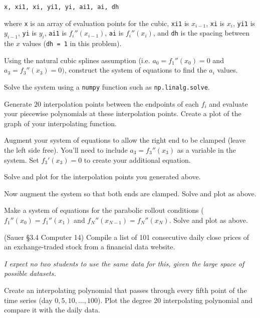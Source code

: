 \documentclass[12pt,letterpaper,noanswers]{exam}
\begin{document}
\begin{questions}
\begin{parts}
\texttt{x, xi1, xi, yi1, yi, ai1, ai, dh}

where \texttt{x} is an array of evaluation points for the cubic,  \texttt{xi1} is $x_{i-1}$, \texttt{xi} is $x_i$, \texttt{yi1} is $y_{i-1}$, \texttt{yi} is $y_i$, \texttt{ai1} is $f_i''(x_{i-1})$, \texttt{ai} is $f_i''(x_{i})$, and \texttt{dh} is the spacing between the $x$ values (\texttt{dh = 1} in this problem).

\item Using the natural cubic splines assumption (i.e. $a_0 = f_1''(x_0) = 0$ and $a_3 = f_3''(x_3) = 0)$, construct the system of equations to find the $a_i$ values.  

Solve the system using a \texttt{numpy} function such as \texttt{np.linalg.solve}.  

Generate $20$ interpolation points between the endpoints of each $f_i$ and evaluate your piecewise polynomials at these interpolation points.  Create a plot of the graph of your interpolating function.





\item Augment your system of equations to allow the right end to be clamped (leave the left side free).  You'll need to include $a_3 = f_3''(x_3)$ as a variable in the system.  Set $f_3'(x_3) = 0$ to create your additional equation.

Solve and plot for the interpolation points you generated above.

\item Now augment the system so that both ends are clamped.  Solve and plot as above.

\item Make a system of equations for the parabolic rollout conditions ($f_1''(x_0) = f_1''(x_1)$ and $f_N''(x_{N-1}) = f_N''(x_N)$.  Solve and plot as above.


\end{parts}

\item (Sauer \S3.4 Computer 14) Compile a list of 101 consecutive daily close prices of an exchange-traded stock from a financial data website.

\emph{I expect no two students to use the same data for this, given the large space of possible datasets.}

\begin{parts}
\item Create an interpolating polynomial that passes through every fifth point of the time series (day $0,5,10,...,100$).  Plot the degree 20 interpolating polynomial and compare it with the daily data.  


\end{parts}
\end{questions}
\end{document}
